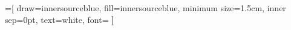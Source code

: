 =[
    draw=innersourceblue,
    fill=innersourceblue,
    minimum size=1.5cm,
    inner sep=0pt,
    text=white,
    font=\Large\bfseries
]
